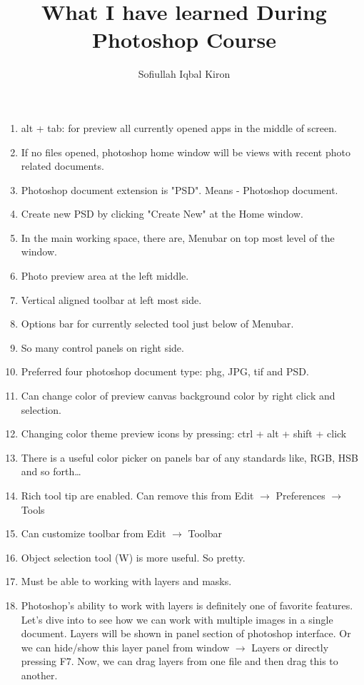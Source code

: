 \documentclass[11 pt]{article}
\title{What I have learned During Photoshop Course}
\author{Sofiullah Iqbal Kiron}
\begin{document}
\maketitle
\tableofcontents


\justify
\begin{enumerate}
	\item alt + tab: for preview all currently opened apps in the middle of screen.
	\item If no files opened, photoshop home window will be views with recent photo related documents.
	\item Photoshop document extension is "PSD". Means - Photoshop document.
	\item Create new PSD by clicking "Create New" at the Home window.
	\item In the main working space, there are, Menubar on top most level of the window.
	\item Photo preview area at the left middle.
	\item Vertical aligned toolbar at left most side.
	\item Options bar for currently selected tool just below of Menubar.
	\item So many control panels on right side.
	\item Preferred four photoshop document type: phg, JPG, tif and PSD.
	\item Can change color of preview canvas background color by right click and selection.
	\item Changing color theme preview icons by pressing: ctrl + alt + shift + click
	\item There is a useful color picker on panels bar of any standards like, RGB, HSB and so forth\dots
	\item Rich tool tip are enabled. Can remove this from Edit $\rightarrow$ Preferences $\rightarrow$ Tools
	\item Can customize toolbar from Edit $\rightarrow$ Toolbar
	\item Object selection tool (W) is more useful. So pretty.
	\item Must be able to working with layers and masks.
	\item Photoshop's ability to work with layers is definitely one of favorite features. Let's dive into to see how we can work with multiple images in a single document. Layers will be shown in panel section of photoshop interface. Or we can hide/show this layer panel from window $\rightarrow$ Layers or directly pressing  F7. Now, we can drag layers from one file and then drag this to another.

\end{enumerate}
\end{document}
